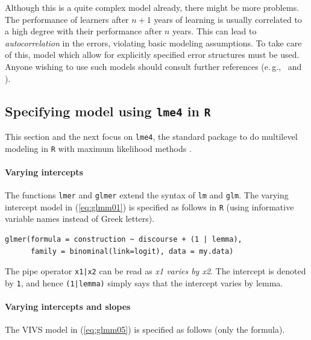 \documentclass[a4paper,12pt]{article}
\newcommand{\eg}{e.\,g.,\ }
\begin{document}
Although this is a quite complex model already, there might be more problems.
The performance of learners after $n+1$ years of learning is usually correlated to a high degree with their performance after $n$ years.
This can lead to \textit{autocorrelation} in the errors, violating basic modeling assumptions.
To take care of this, model which allow for explicitly specified error structures must be used.
Anyone wishing to use such models should consult further references (\eg \citealt{Fox2016} and \citealt{ZuurEa2009}).

\subsection{Specifying model using \texttt{lme4} in \texttt{R}}
\label{sec:specifyingmodelsusinglme4inr}

This section and the next focus on \texttt{lme4}, the standard package to do multilevel modeling in \texttt{R} with maximum likelihood methods \citep{BatesEa2015}.

\paragraph{Varying intercepts}

The functions \texttt{lmer} and \texttt{glmer} extend the syntax of \texttt{lm} and \texttt{glm}.
The varying intercept model in (\ref{eq:glmm01}) is specified as follows in \texttt{R} (using informative variable names instead of Greek letters).

\pagebreak

\vspace{0.5\baselineskip}

\begin{lstlisting}
glmer(formula = construction ~ discourse + (1 | lemma),
      family = binominal(link=logit), data = my.data)
\end{lstlisting}

The pipe operator \texttt{x1|x2} can be read as \textit{x1 varies by x2}.
The intercept is denoted by \texttt{1}, and hence \texttt{(1|lemma)} simply says that the intercept varies by lemma.

\paragraph{Varying intercepts and slopes}

The VIVS model in (\ref{eq:glmm05}) is specified as follows (only the formula).
\end{document}
